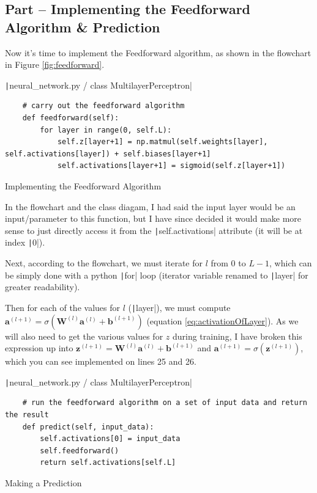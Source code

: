 \documentclass[12pt]{report}
\newcommand{\pil}[1]{\protect\texttt|#1|}
\begin{document}
\subsection{Part \theparts{} -- Implementing the Feedforward Algorithm \& Prediction}

Now it's time to implement the Feedforward algorithm, as shown in the flowchart in Figure \ref{fig:feedforward}.

\begin{listing}[H]
\pil{neural_network.py / class MultilayerPerceptron}
\begin{verbatim}
    # carry out the feedforward algorithm
    def feedforward(self):
        for layer in range(0, self.L):
            self.z[layer+1] = np.matmul(self.weights[layer], self.activations[layer]) + self.biases[layer+1]
            self.activations[layer+1] = sigmoid(self.z[layer+1])
\end{verbatim}
\caption{Implementing the Feedforward Algorithm}\label{cs:feedforwardAlgo}
\end{listing}

In the flowchart and the class diagam, I had said the input layer would be an input/parameter to this function, but I have since decided it would make more sense to just directly access it from the \pil{self.activations} attribute (it will be at index \pil{0}).

Next, according to the flowchart, we must iterate for $l$ from 0 to $L-1$, which can be simply done with a python \pil{for} loop (iterator variable renamed to \pil{layer} for greater readability).

Then for each of the values for $l$ (\pil{layer}), we must compute $\mathbf{a}^{\left(l+1\right)}=\sigma \left(\mathbf{W}^{\left(l\right)}\mathbf{a}^{\left(l\right)}+\mathbf{b}^{\left(l+1\right)}\right)$ (equation \ref{eq:activationOfLayer}). As we will also need to get the various values for $z$ during training, I have broken this expression up into $\mathbf{z}^{\left(l+1\right)}=\mathbf{W}^{\left(l\right)}\mathbf{a}^{\left(l\right)}+\mathbf{b}^{\left(l+1\right)}$ and $\mathbf{a}^{\left(l+1\right)}=\sigma \left(\mathbf{z}^{\left(l+1\right)}\right)$, which you can see implemented on lines 25 and 26.

\begin{listing}[H]
\pil{neural_network.py / class MultilayerPerceptron}
\begin{verbatim}
    # run the feedforward algorithm on a set of input data and return the result
    def predict(self, input_data):
        self.activations[0] = input_data
        self.feedforward()
        return self.activations[self.L]
\end{verbatim}
\caption{Making a Prediction}\label{cs:predictionWrapper}
\end{listing}
\end{document}
